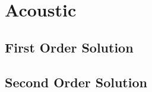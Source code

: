 \section{Acoustic\label{sec:Th-acoustic}}

\subsection{First Order Solution\label{sec:Th-firstorder}}

\subsection{Second Order Solution\label{sec:Th-firstorder}}

